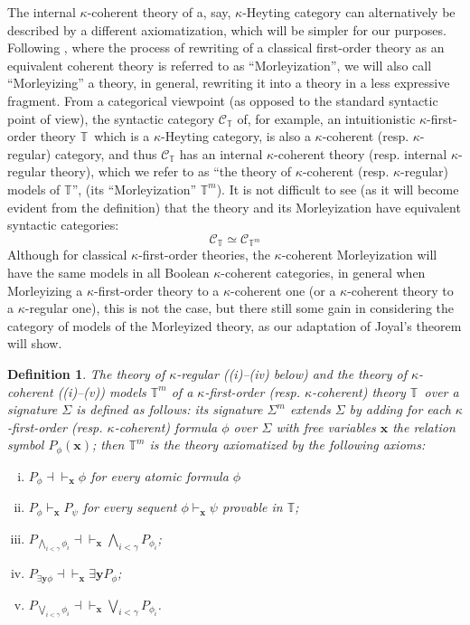 \documentclass[a4paper,11pt]{article}
\theoremstyle{plain}
\theoremstyle{plain}
\newtheorem{defs}[thm]{Definition}
\theoremstyle{remark}
\newcommand{\synt}[2]{\ensuremath{\mathcal{#1}_{{#2}}}}
\newcommand{\alg}[1]{\ensuremath{\mathbf{#1}}}
\newcommand{\theory}{\ensuremath{\mathbb{T}}}
\begin{document}
The internal $\kappa$-coherent theory of a, say, $\kappa$-Heyting category can alternatively be described by a different axiomatization, which will be simpler for our purposes. Following \cite{johnstone}, where the process of rewriting of a classical first-order theory as an equivalent coherent theory is referred to as ``Morleyization'', we will also call ``Morleyizing'' a theory, in general, rewriting it into a theory in a less expressive fragment. From a categorical viewpoint (as opposed to the standard syntactic point of view), the syntactic category \synt{C}{\theory} of, for example, an intuitionistic $\kappa$-first-order theory \theory\, which is a $\kappa$-Heyting category, is also a $\kappa$-coherent (resp. $\kappa$-regular) category, and thus \synt{C}{\theory} has an internal $\kappa$-coherent theory (resp. internal $\kappa$-regular theory), which we refer to as ``the theory of $\kappa$-coherent (resp. $\kappa$-regular) models of \theory'', (its ``Morleyization'' $\theory^m$). It is not difficult to see (as it will become evident from the definition) that the theory and its Morleyization have equivalent syntactic categories:
\[\synt{C}{\theory}\simeq \synt{C}{\theory^m}\]
Although for classical $\kappa$-first-order theories, the $\kappa$-coherent Morleyization will have the same models in all Boolean $\kappa$-coherent categories, in general when Morleyizing a $\kappa$-first-order theory to a $\kappa$-coherent one (or a $\kappa$-coherent theory to a $\kappa$-regular one), this is not the case, but there still some gain in considering the category of models of the Morleyized theory, as our adaptation of Joyal's theorem will show. 

\begin{defs}
The theory of $\kappa$-regular ((i)--(iv) below) and the theory of $\kappa$-coherent ((i)--(v)) models $\theory^m$ of a $\kappa$-first-order (resp. $\kappa$-coherent) theory \theory\ over a signature $\Sigma$ is defined as follows: its signature $\Sigma^m$ extends $\Sigma$ by adding for each $\kappa$-first-order (resp. $\kappa$-coherent) formula $\phi$ over $\Sigma$ with free variables \alg{x} the relation symbol $P_{\phi}(\alg{x})$; then $\theory^m$ is the theory axiomatized by the following axioms:

\begin{enumerate}[(i)]

\item $P_{\phi}\dashv\vdash_{\alg{x}}\phi$ for every atomic formula $\phi$
\item $P_{\phi}\vdash_{\alg{x}}P_{\psi}$ for every sequent $\phi\vdash_{\alg{x}}{\psi}$ provable in \theory;
\item $P_{\bigwedge_{i<\gamma}\phi_i}\dashv\vdash_{\alg{x}}\bigwedge_{i<\gamma}P_{\phi_i}$;
\item $P_{\exists{\mathbf{y}}\phi}\dashv\vdash_{\alg{x}}\exists{\mathbf{y}}P_{\phi}$;
\item $P_{\bigvee_{i<\gamma}\phi_i}\dashv\vdash_{\alg{x}}\bigvee_{i<\gamma}P_{\phi_i}$.

\end{enumerate} 
\end{defs}
\end{document}
